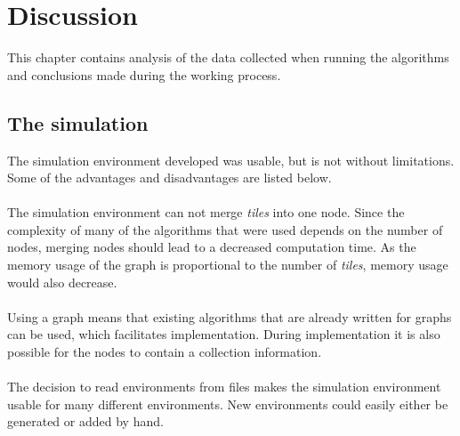 \chapter{Discussion}
This chapter contains analysis of the data collected when running the algorithms and conclusions made during the working process.

\section{The simulation}
The simulation environment developed was usable, but is not without limitations. Some of the advantages and disadvantages are listed below.\\\\
The simulation environment can not merge \emph{tiles} into one node. Since the complexity of many of the algorithms that were used depends on the number of nodes, merging nodes should lead to a decreased computation time. As the memory usage of the graph is proportional to the number of \emph{tiles}, memory usage would also decrease.\\\\
Using a graph means that existing algorithms that are already written for graphs %
can be used, which facilitates implementation. During implementation it is also possible for the nodes to contain a collection information.\\
\\The decision to read environments from files makes the simulation environment usable for many different environments. New environments could easily either be generated or added by hand.
